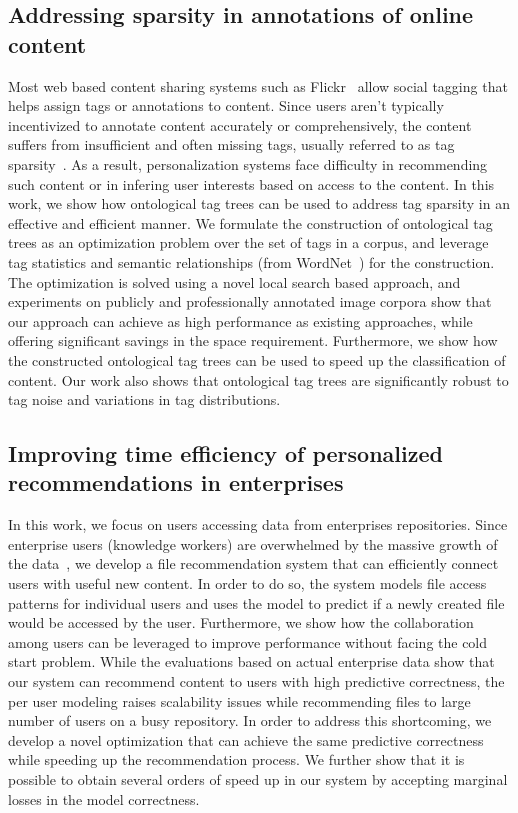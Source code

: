 \documentclass[12pt]{ucsddissertation}
\begin{document}

\subsection{Addressing sparsity in annotations of online content}

Most web based content sharing systems such as Flickr~\cite{Flickr} allow social tagging that helps assign tags or annotations to content. Since users aren't typically incentivized to annotate content accurately or comprehensively, the content suffers from insufficient and often missing tags, usually referred to as tag sparsity~\cite{SunLang11,MohdSemantic13}. 
As a result, personalization systems face difficulty in recommending such content or in infering user interests based on access to the content. 
In this work, we show how ontological tag trees can be used to address tag sparsity in an effective and efficient manner. 
We formulate the construction of ontological tag trees as an optimization problem over the set of tags in a corpus, and leverage tag statistics and semantic relationships (from WordNet~\cite{wordnet}) for the construction. The optimization is solved using a novel local search based approach, and experiments on publicly and professionally annotated image corpora show that our approach can achieve as high performance as existing approaches, while offering significant savings in the space requirement. Furthermore, we show how the constructed ontological tag trees can be used to speed up the classification of content. Our work also shows that ontological tag trees are significantly robust to tag noise and variations in tag distributions. 


\subsection{Improving time efficiency of personalized recommendations in enterprises}


In this work, we focus on users accessing data from enterprises repositories. Since enterprise users (knowledge workers) are overwhelmed by the massive growth of the data~\cite{IDGBigDataSurvey14}, we develop a file recommendation system that can efficiently connect users with useful new content. In order to do so, the system models file access patterns for individual users and uses the model to predict if a newly created file would be accessed by the user. Furthermore, we show how the collaboration among users can be leveraged to improve performance without facing the cold start problem. While the evaluations based on actual enterprise data show that our system can recommend content to users with high predictive correctness, the per user modeling raises scalability issues while recommending files to large number of users on a busy repository. In order to address this shortcoming, we develop a novel optimization that can achieve the same predictive correctness while speeding up the recommendation process. We further show that it is possible to obtain several orders of speed up in our system by accepting marginal losses in the model correctness. 
\end{document}
